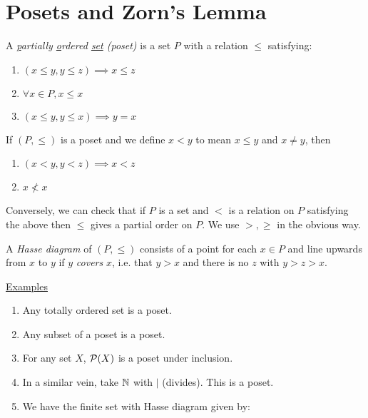 \documentclass[10pt,a4paper]{article}
\begin{document}
\section{Posets and Zorn's Lemma}
A \emph{\underline{p}artially \underline{o}rdered \underline{set} (poset)} is a set $P$ with a relation $\leq$ satisfying:
\begin{enumerate}
\item $(x\leq y, y\leq z) \implies x \leq z$
\item $\forall x \in P, x\leq x$
\item $(x\leq y, y\leq x) \implies y = x$
\end{enumerate}
If $(P, \leq)$ is a poset and we define $x<y$ to mean $x \leq y$ and $x \neq y$, then
\begin{enumerate}
\item $(x<y, y<z) \implies x < z$
\item $x \nless x$
\end{enumerate}

Conversely, we can check that if $P$ is a set and $<$ is a relation on $P$ satisfying the above then $\leq$ gives a partial order on $P$. We use $>, \geq$ in the obvious way.

A \emph{Hasse diagram} of $(P, \leq)$ consists of a point for each $x \in P$ and line upwards from $x$ to $y$ if $y$ \emph{covers} $x$, i.e. that $y > x$ and there is no $z$ with $y > z > x$.

\hspace*{-1em}\underline{Examples}
\begin{enumerate}
\item Any totally ordered set is a poset.
\item Any subset of a poset is a poset.
\item For any set $X$, $\mathcal{P}(X)$ is a poset under inclusion.
\item In a similar vein, take $\mathbb{N}$ with $|$ (divides). This is a poset.
\item We have the finite set with Hasse diagram given by:
\begin{center}
\end{center}
\end{enumerate}
\end{document}
